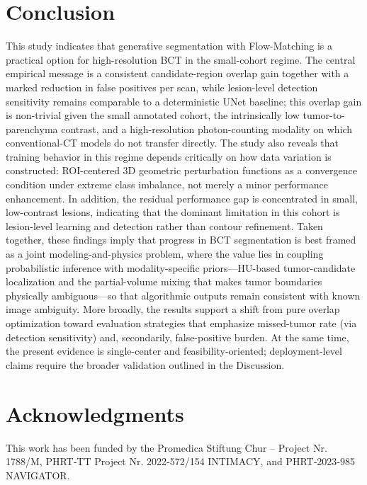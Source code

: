 \documentclass{iopjournal}
\begin{document}
\section{Conclusion}
This study indicates that generative segmentation with Flow-Matching is a practical option for high-resolution BCT in the small-cohort regime. The central empirical message is a consistent candidate-region overlap gain together with a marked reduction in false positives per scan, while lesion-level detection sensitivity remains comparable to a deterministic UNet baseline; this overlap gain is non-trivial given the small annotated cohort, the intrinsically low tumor-to-parenchyma contrast, and a high-resolution photon-counting modality on which conventional-CT models do not transfer directly. The study also reveals that training behavior in this regime depends critically on how data variation is constructed: ROI-centered 3D geometric perturbation functions as a convergence condition under extreme class imbalance, not merely a minor performance enhancement. In addition, the residual performance gap is concentrated in small, low-contrast lesions, indicating that the dominant limitation in this cohort is lesion-level learning and detection rather than contour refinement. Taken together, these findings imply that progress in BCT segmentation is best framed as a joint modeling-and-physics problem, where the value lies in coupling probabilistic inference with modality-specific priors---HU-based tumor-candidate localization and the partial-volume mixing that makes tumor boundaries physically ambiguous---so that algorithmic outputs remain consistent with known image ambiguity. More broadly, the results support a shift from pure overlap optimization toward evaluation strategies that emphasize missed-tumor rate (via detection sensitivity) and, secondarily, false-positive burden. At the same time, the present evidence is single-center and feasibility-oriented; deployment-level claims require the broader validation outlined in the Discussion. 

\section*{Acknowledgments}
This work has been funded by the Promedica Stiftung Chur – Project Nr. 1788/M, PHRT‑TT Project Nr. 2022‑572/154 INTIMACY, and PHRT‑2023‑985 NAVIGATOR.



\end{document}
